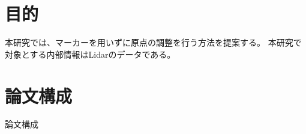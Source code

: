 \section{目的}

本研究では、マーカーを用いずに原点の調整を行う方法を提案する。
本研究で対象とする内部情報はLidarのデータである。


\section{論文構成}

論文構成

%

